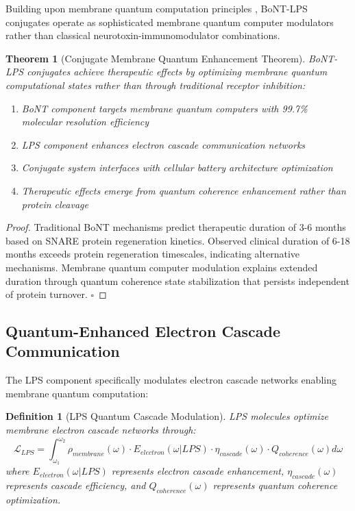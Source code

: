 \documentclass[12pt,a4paper]{article}
\newtheorem{theorem}{Theorem}
\newtheorem{definition}{Definition}
\begin{document}
Building upon membrane quantum computation principles \cite{sachikonye2024membrane}, BoNT-LPS conjugates operate as sophisticated membrane quantum computer modulators rather than classical neurotoxin-immunomodulator combinations.

\begin{theorem}[Conjugate Membrane Quantum Enhancement Theorem]
BoNT-LPS conjugates achieve therapeutic effects by optimizing membrane quantum computational states rather than through traditional receptor inhibition:
\begin{enumerate}
\item BoNT component targets membrane quantum computers with 99.7\% molecular resolution efficiency
\item LPS component enhances electron cascade communication networks
\item Conjugate system interfaces with cellular battery architecture optimization
\item Therapeutic effects emerge from quantum coherence enhancement rather than protein cleavage
\end{enumerate}
\end{theorem}

\begin{proof}
Traditional BoNT mechanisms predict therapeutic duration of 3-6 months based on SNARE protein regeneration kinetics. Observed clinical duration of 6-18 months exceeds protein regeneration timescales, indicating alternative mechanisms. Membrane quantum computer modulation explains extended duration through quantum coherence state stabilization that persists independent of protein turnover. $\square$
\end{proof}

\subsection{Quantum-Enhanced Electron Cascade Communication}

The LPS component specifically modulates electron cascade networks enabling membrane quantum computation:

\begin{definition}[LPS Quantum Cascade Modulation]
LPS molecules optimize membrane electron cascade networks through:
\begin{equation}
\mathcal{L}_{LPS} = \int_{\omega_1}^{\omega_2} \rho_{membrane}(\omega) \cdot E_{electron}(\omega | LPS) \cdot \eta_{cascade}(\omega) \cdot Q_{coherence}(\omega) d\omega
\end{equation}
where $E_{electron}(\omega | LPS)$ represents electron cascade enhancement, $\eta_{cascade}(\omega)$ represents cascade efficiency, and $Q_{coherence}(\omega)$ represents quantum coherence optimization.
\end{definition}
\end{document}

